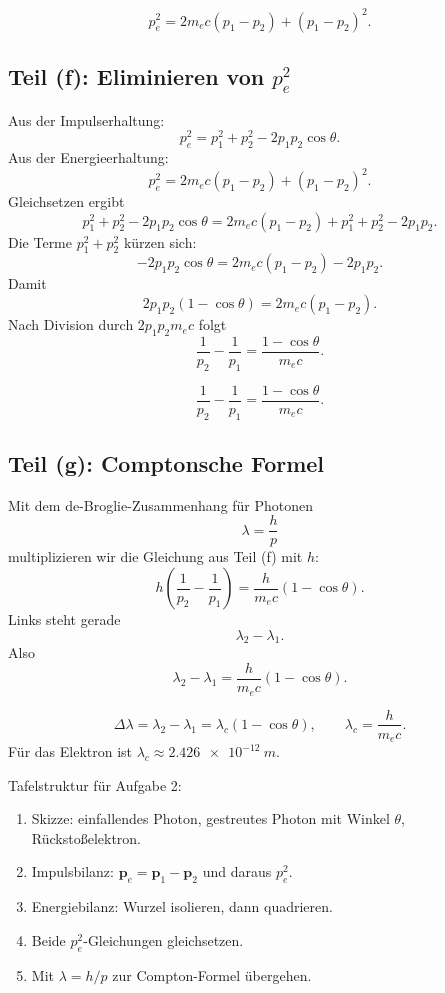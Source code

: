 \documentclass[11pt,a4paper]{scrartcl}
\newcommand{\paren}[1]{\left( #1 \right)}
\newcommand{\vect}[1]{\bm{#1}}
\theoremstyle{definition}
\theoremstyle{plain}
\theoremstyle{remark}
\begin{document}
\begin{answerbox}
\[
    \boxed{p_e^2=2m_ec(p_1-p_2)+(p_1-p_2)^2.}
\]
\end{answerbox}

\subsection{Teil (f): Eliminieren von $p_e^2$}

\begin{calculationbox}
Aus der Impulserhaltung:
\[
    p_e^2=p_1^2+p_2^2-2p_1p_2\cos\theta.
\]
Aus der Energieerhaltung:
\[
    p_e^2=2m_ec(p_1-p_2)+(p_1-p_2)^2.
\]
Gleichsetzen ergibt
\[
    p_1^2+p_2^2-2p_1p_2\cos\theta
    =2m_ec(p_1-p_2)+p_1^2+p_2^2-2p_1p_2.
\]
Die Terme $p_1^2+p_2^2$ kürzen sich:
\[
    -2p_1p_2\cos\theta=2m_ec(p_1-p_2)-2p_1p_2.
\]
Damit
\[
    2p_1p_2(1-\cos\theta)=2m_ec(p_1-p_2).
\]
Nach Division durch $2p_1p_2m_ec$ folgt
\[
    \frac{1}{p_2}-\frac{1}{p_1}=\frac{1-\cos\theta}{m_ec}.
\]
\end{calculationbox}

\begin{answerbox}
\[
    \boxed{\frac{1}{p_2}-\frac{1}{p_1}=\frac{1-\cos\theta}{m_ec}.}
\]
\end{answerbox}

\subsection{Teil (g): Comptonsche Formel}

\begin{calculationbox}
Mit dem de-Broglie-Zusammenhang für Photonen
\[
    \lambda=\frac{h}{p}
\]
multiplizieren wir die Gleichung aus Teil (f) mit $h$:
\[
    h\paren{\frac{1}{p_2}-\frac{1}{p_1}}
    =\frac{h}{m_ec}(1-\cos\theta).
\]
Links steht gerade
\[
    \lambda_2-\lambda_1.
\]
Also
\[
    \lambda_2-\lambda_1=\frac{h}{m_ec}(1-\cos\theta).
\]
\end{calculationbox}

\begin{answerbox}
\[
    \boxed{\Delta\lambda=\lambda_2-\lambda_1=\lambda_c(1-\cos\theta),
    \qquad
    \lambda_c=\frac{h}{m_ec}.}
\]
Für das Elektron ist $\lambda_c\approx\SI{2.426e-12}{m}$.
\end{answerbox}

\begin{talkbox}
Tafelstruktur für Aufgabe 2:
\begin{enumerate}[label=\arabic*.]
    \item Skizze: einfallendes Photon, gestreutes Photon mit Winkel $\theta$, Rückstoßelektron.
    \item Impulsbilanz: $\vect p_e=\vect p_1-\vect p_2$ und daraus $p_e^2$.
    \item Energiebilanz: Wurzel isolieren, dann quadrieren.
    \item Beide $p_e^2$-Gleichungen gleichsetzen.
    \item Mit $\lambda=h/p$ zur Compton-Formel übergehen.
\end{enumerate}
\end{talkbox}
\end{document}
